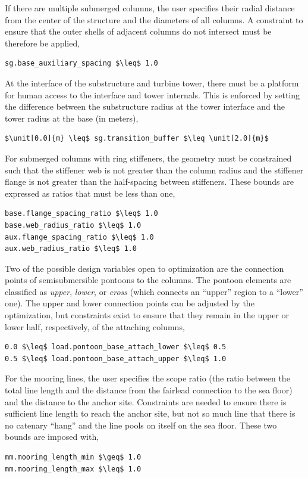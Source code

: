 If there are multiple submerged columns, the user specifies their radial
distance from the center of the structure and the diameters of all
columns.  A constraint to ensure that the outer shells of adjacent
columns do not intersect must be therefore be applied,
\begin{lstlisting}
sg.base_auxiliary_spacing $\leq$ 1.0
\end{lstlisting}

At the interface of the substructure and turbine tower, there must be a
platform for human access to the interface and tower internals.  This is
enforced by setting the difference between the substructure radius at
the tower interface and the tower radius at the base (in meters),
\begin{lstlisting}
$\unit[0.0]{m} \leq$ sg.transition_buffer $\leq \unit[2.0]{m}$
\end{lstlisting}

For submerged columns with ring stiffeners, the geometry must be
constrained such that the stiffener web is not greater than the column
radius and the stiffener flange is not greater than the half-spacing
between stiffeners.  These bounds are expressed as ratios that must be
less than one,
\begin{lstlisting}
base.flange_spacing_ratio $\leq$ 1.0
base.web_radius_ratio $\leq$ 1.0
aux.flange_spacing_ratio $\leq$ 1.0
aux.web_radius_ratio $\leq$ 1.0
\end{lstlisting}

Two of the possible design variables open to optimization are the
connection points of semisubmersible pontoons to the columns.  The
pontoon elements are classified as \textit{upper}, \textit{lower}, or
\textit{cross} (which connects an ``upper'' region to a ``lower'' one).
The upper and lower connection points can be adjusted by the
optimization, but constraints exist to ensure that they remain in the
upper or lower half, respectively, of the attaching columns,
\begin{lstlisting}
0.0 $\leq$ load.pontoon_base_attach_lower $\leq$ 0.5
0.5 $\leq$ load.pontoon_base_attach_upper $\leq$ 1.0
\end{lstlisting}

For the mooring lines, the user specifies the scope ratio (the ratio
between the total line length and the distance from the fairlead
connection to the sea floor) and the distance to the anchor site.
Constraints are needed to ensure there is sufficient line length to
reach the anchor site, but not so much line that there is no catenary
``hang'' and the line pools on itself on the sea floor.  These two
bounds are imposed with,
\begin{lstlisting}
mm.mooring_length_min $\geq$ 1.0
mm.mooring_length_max $\leq$ 1.0
\end{lstlisting}


